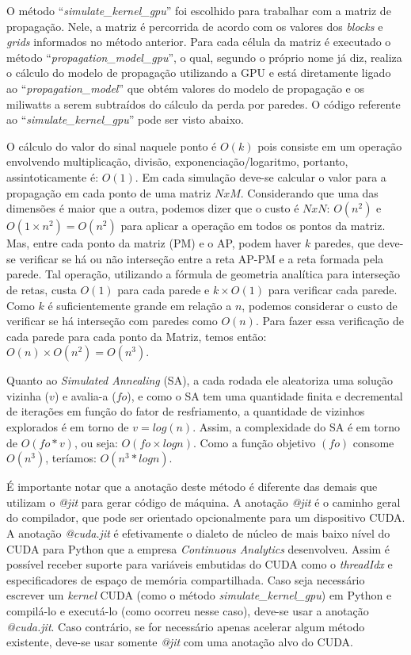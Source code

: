 \documentclass[
	12pt,				%
	twoside,			%
	a4paper,			%
	english,			%
	french,				%
	spanish,			%
	brazil				%
	]{abntex2}
\begin{document}
O método ``\emph{simulate\_kernel\_gpu}'' foi escolhido para trabalhar
com a matriz de propagação. Nele, a matriz é percorrida de acordo com os
valores dos \emph{blocks} e \emph{grids} informados no método anterior.
Para cada célula da matriz é executado o método
``\emph{propagation\_model\_gpu}'', o qual, segundo o próprio nome já
diz, realiza o cálculo do modelo de propagação utilizando a GPU e está
diretamente ligado ao ``\emph{propagation\_model}'' que obtém valores do
modelo de propagação e os miliwatts a serem subtraídos do cálculo da
perda por paredes. O código referente ao
``\emph{simulate\_kernel\_gpu}'' pode ser visto abaixo.



O cálculo do valor do sinal naquele ponto é \(O(k)\) pois consiste em um
operação envolvendo multiplicação, divisão, exponenciação/logaritmo,
portanto, assintoticamente é: \(O(1)\). Em cada simulação deve-se
calcular o valor para a propagação em cada ponto de uma matriz \(NxM\).
Considerando que uma das dimensões é maior que a outra, podemos dizer
que o custo é \(NxN\): \(O(n^{2})\) e \(O(1\times n^{2}) = O(n^{2})\)
para aplicar a operação em todos os pontos da matriz. Mas, entre cada
ponto da matriz (PM) e o AP, podem haver \(k\) paredes, que deve-se
verificar se há ou não interseção entre a reta AP-PM e a reta formada
pela parede. Tal operação, utilizando a fórmula de geometria analítica
para interseção de retas, custa \(O(1)\) para cada parede e
\(k\times O(1)\) para verificar cada parede. Como \(k\) é
suficientemente grande em relação a \(n\), podemos considerar o custo de
verificar se há interseção com paredes como \(O(n)\). Para fazer essa
verificação de cada parede para cada ponto da Matriz, temos então:
\(O(n)\times O(n^{2}) = O(n^{3})\).

Quanto ao \emph{Simulated Annealing} (SA), a cada rodada ele aleatoriza
uma solução vizinha (\(v\)) e avalia-a (\(fo\)), e como o SA tem uma
quantidade finita e decremental de iterações em função do fator de
resfriamento, a quantidade de vizinhos explorados é em torno de
\(v = log(n)\). Assim, a complexidade do SA é em torno de \(O(fo*v)\),
ou seja: \(O(fo \times log n)\). Como a função objetivo \((fo)\) consome
\(O(n^{3})\), teríamos: \(O(n^{3} * log n)\).

É importante notar que a anotação deste método é diferente das demais
que utilizam o \emph{@jit} para gerar código de máquina. A anotação
\emph{@jit} é o caminho geral do compilador, que pode ser orientado
opcionalmente para um dispositivo CUDA. A anotação \emph{@cuda.jit} é
efetivamente o dialeto de núcleo de mais baixo nível do CUDA para Python
que a empresa \emph{Continuous Analytics} desenvolveu. Assim é possível
receber suporte para variáveis embutidas do CUDA como o \emph{threadIdx}
e especificadores de espaço de memória compartilhada. Caso seja
necessário escrever um \emph{kernel} CUDA (como o método
\emph{simulate\_kernel\_gpu}) em Python e compilá-lo e executá-lo (como
ocorreu nesse caso), deve-se usar a anotação \emph{@cuda.jit}. Caso
contrário, se for necessário apenas acelerar algum método existente,
deve-se usar somente \emph{@jit} com uma anotação alvo do CUDA.
\end{document}
